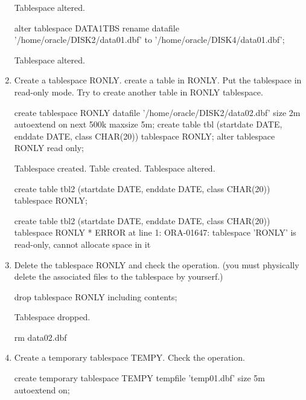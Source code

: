 \documentclass{article}
\begin{document}
\begin{enumerate}
\begin{messageshell}
Tablespace altered.
\end{messageshell}

\begin{sqlshell}
alter tablespace DATA1TBS rename datafile '/home/oracle/DISK2/data01.dbf' to '/home/oracle/DISK4/data01.dbf';
\end{sqlshell}
\begin{messageshell}

Tablespace altered.
\end{messageshell}

\item{Create a tablespace RONLY. create a table in RONLY. Put the tablespace in read-only mode. Try to create another table in RONLY tablespace.}
\begin{sqlshell}
create tablespace RONLY datafile '/home/oracle/DISK2/data02.dbf' size 2m autoextend on next 500k maxsize 5m;
create table tbl (startdate DATE, enddate DATE, class CHAR(20)) tablespace RONLY;
alter tablespace RONLY read only;
\end{sqlshell}
\begin{messageshell}

Tablespace created.
Table created.
Tablespace altered.
\end{messageshell}
\begin{sqlshell}
create table tbl2 (startdate DATE, enddate DATE, class CHAR(20)) tablespace RONLY;
\end{sqlshell}
\begin{messageshell}
create table tbl2 (startdate DATE, enddate DATE, class CHAR(20)) tablespace RONLY
*
ERROR at line 1:
ORA-01647: tablespace 'RONLY' is read-only, cannot allocate space in it

\end{messageshell}
\item{Delete the tablespace RONLY and check the operation. (you must physically delete the associated files to the tablespace by yourserf.)}
\begin{sqlshell}
drop tablespace RONLY including contents;
\end{sqlshell}
\begin{messageshell}

Tablespace dropped.

\end{messageshell}
\begin{commandshell}
rm data02.dbf
\end{commandshell}

\item{Create a temporary tablespace TEMPY. Check the operation.}
\begin{sqlshell}
create temporary tablespace TEMPY tempfile 'temp01.dbf' size 5m autoextend on;
\end{sqlshell}
\begin{messageshell}


\end{messageshell}
\end{enumerate}
\end{document}
